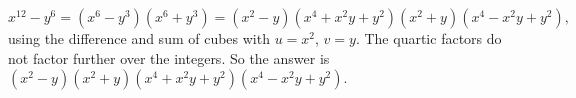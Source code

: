 \[x^{12}-y^6=(x^6-y^3)(x^6+y^3)=(x^2-y)(x^4+x^2y+y^2)(x^2+y)(x^4-x^2y+y^2),\]
using the difference and sum of cubes with $u=x^2$, $v=y$. The quartic factors do not factor further over the integers. So the answer is $\boxed{(x^2-y)(x^2+y)(x^4+x^2y+y^2)(x^4-x^2y+y^2)}$.
